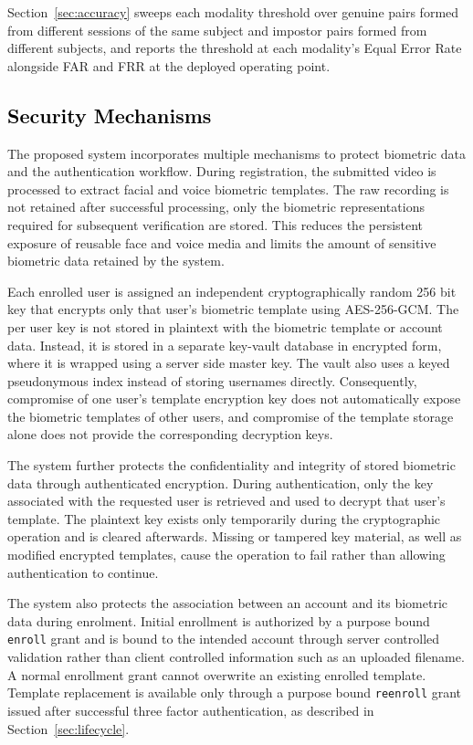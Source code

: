 \documentclass[runningheads]{llncs}
\begin{document}
{{Section~\ref{sec:accuracy} sweeps each modality threshold over genuine pairs formed from different sessions of the same subject and impostor pairs formed from different subjects, and reports the threshold at each modality's Equal Error Rate alongside FAR and FRR at the deployed operating point.

\subsection{\textcolor{black}{Security Mechanisms}}\label{sec:security}
The proposed system incorporates multiple mechanisms to protect biometric data and the authentication workflow. During registration, the submitted video is processed to extract facial and voice biometric templates. The raw recording is not retained after successful processing, only the biometric representations required for subsequent verification are stored. This reduces the persistent exposure of reusable face and voice media and limits the amount of sensitive biometric data retained by the system.

Each enrolled user is assigned an independent cryptographically random 256 bit key that encrypts only that user's biometric template using AES-256-GCM. The per user key is not stored in plaintext with the biometric template or account data. Instead, it is stored in a separate key-vault database in encrypted form, where it is wrapped using a server side master key. The vault also uses a keyed pseudonymous index instead of storing usernames directly. Consequently, compromise of one user's template encryption key does not automatically expose the biometric templates of other users, and compromise of the template storage alone does not provide the corresponding decryption keys.

The system further protects the confidentiality and integrity of stored biometric data through authenticated encryption. During authentication, only the key associated with the requested user is retrieved and used to decrypt that user's template. The plaintext key exists only temporarily during the cryptographic operation and is cleared afterwards. Missing or tampered key material, as well as modified encrypted templates, cause the operation to fail rather than allowing authentication to continue.

The system also protects the association between an account and its biometric data during enrolment. Initial enrollment is authorized by a purpose bound \texttt{enroll} grant and is bound to the intended account through server controlled validation rather than client controlled information such as an uploaded filename. A normal enrollment grant cannot overwrite an existing enrolled template. Template replacement is available only through a purpose bound \texttt{reenroll} grant issued after successful three factor authentication, as described in Section~\ref{sec:lifecycle}.

}}
\end{document}
